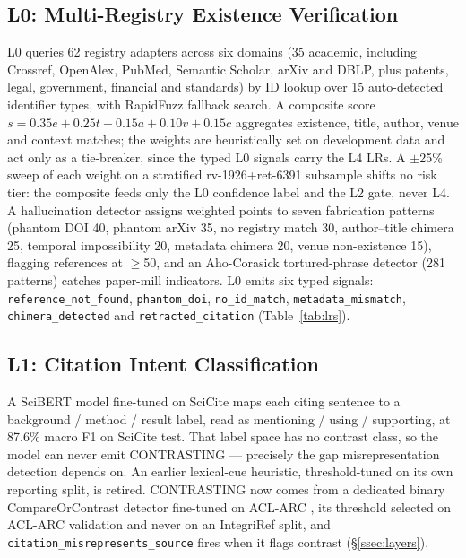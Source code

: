 \documentclass[letterpaper]{article} %
\begin{document}
\subsection{L0: Multi-Registry Existence Verification}

L0 queries 62 registry adapters across six domains (35 academic, including Crossref, OpenAlex, PubMed, Semantic Scholar, arXiv and DBLP, plus patents, legal, government, financial and standards) by ID lookup over 15 auto-detected identifier types, with RapidFuzz fallback search. A composite score $s = 0.35e + 0.25t + 0.15a + 0.10v + 0.15c$ aggregates existence, title, author, venue and context matches; the weights are heuristically set on development data and act only as a tie-breaker, since the typed L0 signals carry the L4 LRs. A $\pm$25\% sweep of each weight on a stratified rv-1926+ret-6391 subsample shifts no risk tier: the composite feeds only the L0 confidence label and the L2 gate, never L4. A hallucination detector assigns weighted points to seven fabrication patterns (phantom DOI 40, phantom arXiv 35, no registry match 30, author--title chimera 25, temporal impossibility 20, metadata chimera 20, venue non-existence 15), flagging references at $\geq$50, and an Aho-Corasick tortured-phrase detector (281 patterns) catches paper-mill indicators. L0 emits six typed signals: \texttt{reference\_not\_found}, \texttt{phantom\_doi}, \texttt{no\_id\_match}, \texttt{metadata\_mismatch}, \texttt{chimera\_detected} and \texttt{retracted\_citation} (Table~\ref{tab:lrs}).

\subsection{L1: Citation Intent Classification}

A SciBERT model fine-tuned on SciCite \cite{cohan2019structural} maps each citing sentence to a background / method / result label, read as mentioning / using / supporting, at 87.6\% macro F1 on SciCite test. That label space has no contrast class, so the model can never emit CONTRASTING --- precisely the gap misrepresentation detection depends on. An earlier lexical-cue heuristic, threshold-tuned on its own reporting split, is retired. CONTRASTING now comes from a dedicated binary CompareOrContrast detector fine-tuned on ACL-ARC \cite{jurgens2018measuring}, its threshold selected on ACL-ARC validation and never on an IntegriRef split, and \texttt{citation\_\allowbreak misrepresents\_\allowbreak source} fires when it flags contrast (\S\ref{ssec:layers}).
\end{document}
